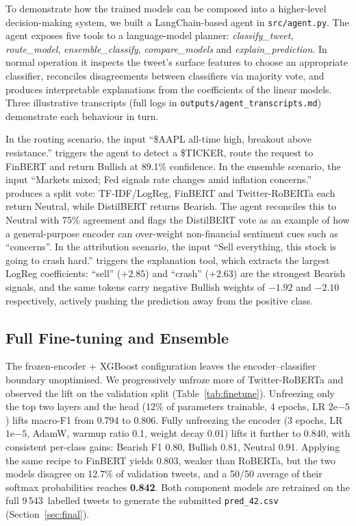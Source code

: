 \documentclass[12pt,a4paper]{article}
\begin{document}
To demonstrate how the trained models can be composed into a higher-level decision-making system, we built a LangChain-based agent in \texttt{src/agent.py}. The agent exposes five tools to a language-model planner: \textit{classify\_tweet}, \textit{route\_model}, \textit{ensemble\_classify}, \textit{compare\_models} and \textit{explain\_\allowbreak prediction}. In normal operation it inspects the tweet's surface features to choose an appropriate classifier, reconciles disagreements between classifiers via majority vote, and produces interpretable explanations from the coefficients of the linear models. Three illustrative transcripts (full logs in \texttt{outputs/\allowbreak agent\_transcripts.md}) demonstrate each behaviour in turn.

In the routing scenario, the input ``\$AAPL all-time high, breakout above resistance.'' triggers the agent to detect a \$TICKER, route the request to FinBERT and return Bullish at 89.1\% confidence. In the ensemble scenario, the input ``Markets mixed; Fed signals rate changes amid inflation concerns.'' produces a split vote: TF-IDF/LogReg, FinBERT and Twitter-RoBERTa each return Neutral, while DistilBERT returns Bearish. The agent reconciles this to Neutral with 75\% agreement and flags the DistilBERT vote as an example of how a general-purpose encoder can over-weight non-financial sentiment cues such as ``concerns''. In the attribution scenario, the input ``Sell everything, this stock is going to crash hard.'' triggers the explanation tool, which extracts the largest LogReg coefficients: ``sell'' ($+2.85$) and ``crash'' ($+2.63$) are the strongest Bearish signals, and the same tokens carry negative Bullish weights of $-1.92$ and $-2.10$ respectively, actively pushing the prediction away from the positive class.

\subsection{Full Fine-tuning and Ensemble}
\label{sec:finetune}

The frozen-encoder + XGBoost configuration leaves the encoder--classifier boundary unoptimised. We progressively unfroze more of Twitter-RoBERTa and observed the lift on the validation split (Table~\ref{tab:finetune}). Unfreezing only the top two layers and the head (12\% of parameters trainable, 4 epochs, LR $2\mathrm{e}{-5}$) lifts macro-F1 from 0.794 to 0.806. Fully unfreezing the encoder (3 epochs, LR $1\mathrm{e}{-5}$, AdamW, warmup ratio 0.1, weight decay 0.01) lifts it further to 0.840, with consistent per-class gains: Bearish F1 0.80, Bullish 0.81, Neutral 0.91. Applying the same recipe to FinBERT yields 0.803, weaker than RoBERTa, but the two models disagree on 12.7\% of validation tweets, and a 50/50 average of their softmax probabilities reaches \textbf{0.842}. Both component models are retrained on the full 9\,543~labelled tweets to generate the submitted \texttt{pred\_42.csv} (Section~\ref{sec:final}).
\end{document}

